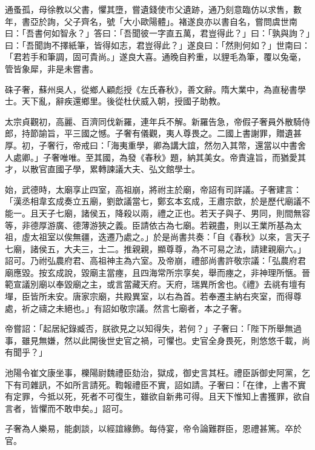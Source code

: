 \begin{pinyinscope}
 通蚤孤，母徐教以父書，懼其墮，嘗遺錢使市父遺跡，通乃刻意臨仿以求售，數年，書亞於詢，父子齊名，號「大小歐陽體」。褚遂良亦以書自名，嘗問虞世南曰：「吾書何如智永？」答曰：「吾聞彼一字直五萬，君豈得此？」曰：「孰與詢？」曰：「吾聞詢不擇紙筆，皆得如志，君豈得此？」遂良曰：「然則何如？」世南曰：「君若手和筆調，固可貴尚。」遂良大喜。通晚自矜重，以貍毛為筆，覆以兔毫，管皆象犀，非是未嘗書。



 硃子奢，蘇州吳人，從鄉人顧彪授《左氏春秋》，善文辭。隋大業中，為直秘書學士。天下亂，辭疾還鄉里。後從杜伏威入朝，授國子助教。



 太宗貞觀初，高麗、百濟同伐新羅，連年兵不解。新羅告急，帝假子奢員外散騎侍郎，持節諭旨，平三國之憾。子奢有儀觀，夷人尊畏之。二國上書謝罪，贈遺甚厚。初，子奢行，帝戒曰：「海夷重學，卿為講大誼，然勿入其幣，還當以中書舍人處卿。」子奢唯唯。至其國，為發《春秋》題，納其美女。帝責違旨，而猶愛其才，以散官直國子學，累轉諫議大夫、弘文館學士。



 始，武德時，太廟享止四室，高祖崩，將祔主於廟，帝詔有司詳議。子奢建言：「漢丞相韋玄成奏立五廟，劉歆議當七，鄭玄本玄成，王肅宗歆，於是歷代廟議不能一。且天子七廟，諸侯五，降殺以兩，禮之正也。若天子與子、男同，則間無容等，非德厚游廣、德薄游狹之義。臣請依古為七廟。若親盡，則以王業所基為太祖，虛太祖室以俟無疆，迭遷乃處之。」於是尚書共奏：「自《春秋》以來，言天子七廟，諸侯五，大夫三，士二。推親親，顯尊尊，為不可易之法，請建親廟六。」詔可。乃祔弘農府君、高祖神主為六室。及帝崩，禮部尚書許敬宗議：「弘農府君廟應毀。按玄成說，毀廟主當瘞，且四海常所宗享矣，舉而瘞之，非神理所愜。晉範宣議別廟以奉毀廟之主，或言當藏天府。天府，瑞異所舍也。《禮》去祧有壇有墠，臣皆所未安。唐家宗廟，共殿異室，以右為首。若奉遷主納右夾室，而得尊處，祈之禱之未絕也。」有詔如敬宗議。然言七廟者，本之子奢。



 帝嘗詔：「起居紀錄臧否，朕欲見之以知得失，若何？」子奢曰：「陛下所舉無過事，雖見無嫌，然以此開後世史官之禍，可懼也。史官全身畏死，則悠悠千載，尚有聞乎？」



 池陽令崔文康坐事，櫟陽尉魏禮臣劾治，獄成，御史言其枉。禮臣訴御史阿黨，乞下有司雜訊，不如所言請死。鞫報禮臣不實，詔如請。子奢曰：「在律，上書不實有定罪，今抵以死，死者不可復生，雖欲自新弗可得。且天下惟知上書獲罪，欲自言者，皆懼而不敢申矣。」詔可。



 子奢為人樂易，能劇談，以經誼緣飾。每侍宴，帝令論難群臣，恩禮甚篤。卒於官。




\end{pinyinscope}

